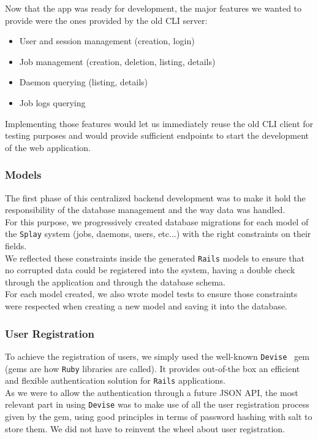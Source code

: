 \documentclass{eplmastersthesis}
\begin{document}
        Now that the app was ready for development, the major features
        we wanted to provide were the ones provided by the old CLI server:

        \begin{itemize}
          \item User and session management (creation, login)
          \item Job management (creation, deletion, listing, details)
          \item Daemon querying (listing, details)
          \item Job logs querying
        \end{itemize}

        Implementing those features would let us immediately reuse the old
        CLI client for testing purposes and would provide sufficient endpoints
        to start the development of the web application.\\

        \subsubsection{Models}

          The first phase of this centralized backend development was
          to make it hold the responsibility of the database management and
          the way data was handled.\\

          For this purpose, we progressively created database migrations
          for each model of the \texttt{Splay} system (jobs, daemons, users, etc...)
          with the right constraints on their fields.\\
          We reflected these constraints inside the generated \texttt{Rails} models to
          ensure that no corrupted data could be registered into the system,
          having a double check through the application and through the
          database schema.\\
          For each model created, we also wrote model tests to ensure those
          constraints were respected when creating a new model and saving it
          into the database.

        \subsubsection{User Registration}

          To achieve the registration of users, we simply used the
          well-known \texttt{Devise}~\cite{devise} gem (gems are how \texttt{Ruby} libraries are
          called). It provides out-of-the box an efficient and flexible
          authentication solution for \texttt{Rails} applications.\\
          As we were to allow the authentication through a future JSON API,
          the most relevant part in using \texttt{Devise} was to make use of all
          the user registration process given by the gem, using good principles
          in terms of password hashing with salt to store them. We did not
          have to reinvent the wheel about user registration.\\
\end{document}
